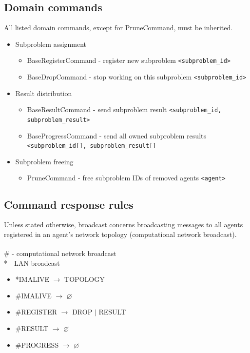 \documentclass{article}
\begin{document}
\subsection{Domain commands}
All listed domain commands, except for PruneCommand, must be inherited.
\begin{itemize}
    \item Subproblem assignment
    \begin{itemize}
        \item BaseRegisterCommand - register new subproblem \verb!<subproblem_id>!
        \item BaseDropCommand - stop working on this subproblem \verb!<subproblem_id>!
    \end{itemize}
    \item Result distribution
    \begin{itemize}
        \item BaseResultCommand - send subproblem result \verb!<subproblem_id, subproblem_result>!
        \item BaseProgressCommand - send all owned subproblem results \verb!<subproblem_id[], subproblem_result[]!
    \end{itemize}
    \item Subproblem freeing
    \begin{itemize}
        \item PruneCommand - free subproblem IDs of removed agents \verb!<agent>!
    \end{itemize}
\end{itemize}

\subsection{Command response rules}
Unless stated otherwise, broadcast concerns broadcasting messages to all agents registered in an agent's network topology (computational network broadcast). \\\\
\# - computational network broadcast\\
* - LAN broadcast
\begin{itemize}
    \item *IMALIVE $\rightarrow$ TOPOLOGY
    \item \#{}IMALIVE $\rightarrow$ $\varnothing$
    \item \#{}REGISTER $\rightarrow$ DROP $\vert$ RESULT
    \item \#{}RESULT $\rightarrow$ $\varnothing$
    \item \#{}PROGRESS $\rightarrow$ $\varnothing$
\end{itemize}
\end{document}
